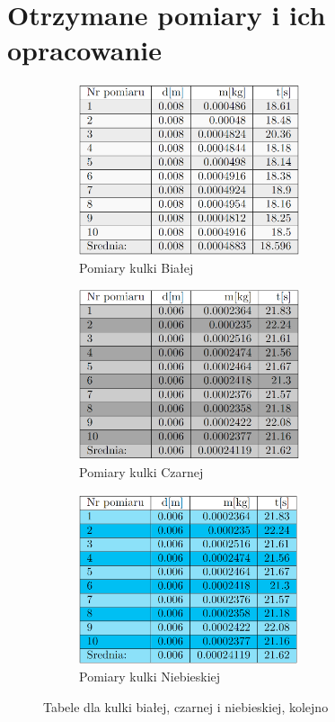 \documentclass{article}
\begin{document}
\newpage
\section{Otrzymane pomiary i ich opracowanie}
\begin{figure}[h!]

    \begin{subfigure}{0.5\textwidth}
        \includegraphics[width=0.9\linewidth, height=5cm]{t_biala_pom.png} 
        \caption{Pomiary kulki Białej}
        \label{fig:subim1}
    \end{subfigure}
    \begin{subfigure}{0.5\textwidth}
        \includegraphics[width=0.9\linewidth, height=5cm]{t_czarna_pom.png}
        \caption{Pomiary kulki Czarnej}
        \label{fig:subim2}
    \end{subfigure}
    \begin{center}
        
        \begin{subfigure}{0.5\textwidth}
            \centering
        \includegraphics[width=0.9\linewidth, height=5cm]{t_niebieska_pom.png}
        \caption{Pomiary kulki Niebieskiej}
        \label{fig:subim2}
    \end{subfigure}
    \end{center}     
     \caption{Tabele dla kulki białej, czarnej i niebieskiej, kolejno}
\end{figure}
\end{document}
